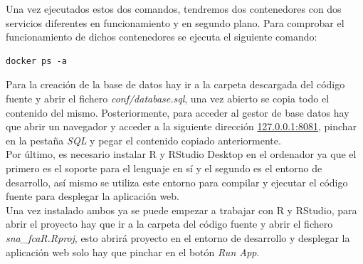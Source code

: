 \documentclass[../../main.tex]{subfiles}
\begin{document}
\vskip 0.2in

Una vez ejecutados estos dos comandos, tendremos dos contenedores con dos servicios diferentes en funcionamiento y en segundo plano. Para comprobar el funcionamiento de dichos contenedores se ejecuta el siguiente comando:

\begin{lstlisting}
docker ps -a
\end{lstlisting}

\vskip 0.2in

Para la creación de la base de datos hay ir a la carpeta descargada del código fuente y abrir el fichero \textit{conf/database.sql}, una vez abierto se copia todo el contenido del mismo.
Posteriormente, para acceder al gestor de base datos hay que abrir un navegador y acceder a la siguiente dirección \href{127.0.0.1:8081}{127.0.0.1:8081}, pinchar en la pestaña \textit{SQL} y pegar el contenido copiado anteriormente. \\

Por último, es necesario instalar R\cite{doc16} y RStudio Desktop\cite{doc15} en el ordenador ya que el primero es el soporte para el lenguaje en sí y el segundo es el entorno de desarrollo, así mismo se utiliza este entorno para compilar y ejecutar el código fuente para desplegar la aplicación web. \\
Una vez instalado ambos ya se puede empezar a trabajar con R y RStudio, para abrir el proyecto hay que ir a la carpeta del código fuente y abrir el fichero \textit{sna\_fcaR.Rproj}, esto abrirá proyecto en el entorno de desarrollo y desplegar la aplicación web solo hay que pinchar en el botón \textit{Run App}. \\
\end{document}
